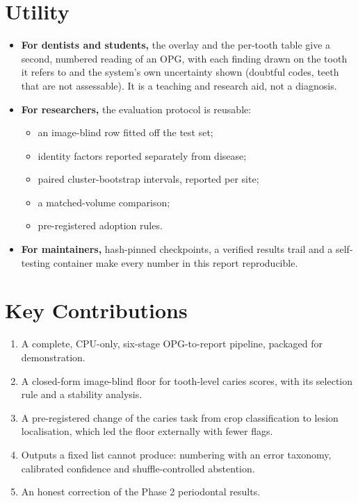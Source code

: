 \section{Utility}

\begin{itemize}
\item \textbf{For dentists and students,} the overlay and the per-tooth table give a second, numbered
  reading of an OPG, with each finding drawn on the tooth it refers to and the system's own uncertainty
  shown (doubtful codes, teeth that are not assessable). It is a teaching and research aid, not a
  diagnosis.
\item \textbf{For researchers,} the evaluation protocol is reusable:
  \begin{itemize}
  \item an image-blind row fitted off the test set;
  \item identity factors reported separately from disease;
  \item paired cluster-bootstrap intervals, reported per site;
  \item a matched-volume comparison;
  \item pre-registered adoption rules.
  \end{itemize}
\item \textbf{For maintainers,} hash-pinned checkpoints, a verified results trail and a self-testing
  container make every number in this report reproducible.
\end{itemize}

\section{Key Contributions}

\begin{enumerate}[label=\arabic*.,leftmargin=1.6em]
\item A complete, CPU-only, six-stage OPG-to-report pipeline, packaged for demonstration.
\item A closed-form image-blind floor for tooth-level caries scores, with its selection rule and a
  stability analysis.
\item A pre-registered change of the caries task from crop classification to lesion localisation, which
  led the floor externally with fewer flags.
\item Outputs a fixed list cannot produce: numbering with an error taxonomy, calibrated confidence and
  shuffle-controlled abstention.
\item An honest correction of the Phase 2 periodontal results.
\end{enumerate}

